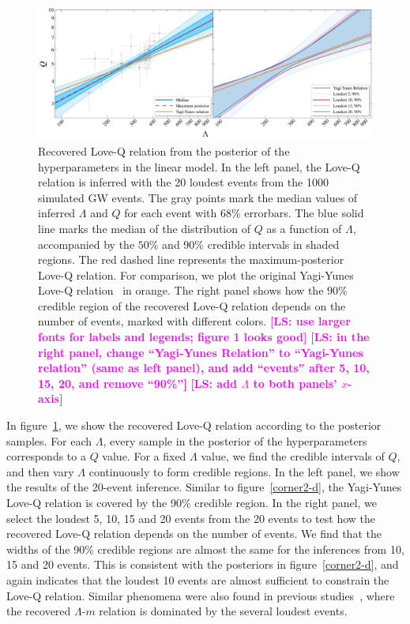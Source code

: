 \documentclass[a4paper,11pt]{article}
\newcommand{\LS}[1]{\textcolor{magenta}{\bf #1}}
\begin{document}
\begin{figure}[t]
\centering
\includegraphics[width=\textwidth]{fig_hierarchical_results_APR4_2d.pdf}
    \caption{Recovered Love-Q relation from the posterior of the hyperparameters
    in the linear model. In the left panel, the Love-Q relation is inferred with
    the 20 loudest events from the 1000 simulated GW events. The gray points
    mark the median values of inferred $\Lambda$ and $Q$ for each event with
    $68\%$ errorbars. The blue solid line marks the median of the distribution
    of $Q$ as a function of $\Lambda$, accompanied by the $50\%$ and $90\%$
    credible intervals in shaded regions.  The red dashed line represents the
    maximum-posterior Love-Q relation. For comparison, we plot the original
    Yagi-Yunes Love-Q relation~\cite{Yagi_2017} in orange. The right panel shows
    how the $90\%$ credible region of the recovered Love-Q relation depends on
    the number of events, marked with different colors. \LS{[LS: use larger
    fonts for labels and legends; figure 1 looks good]} \LS{[LS: in the right
    panel, change ``Yagi-Yunes Relation'' to ``Yagi-Yunes relation'' (same as
    left panel), and add ``events'' after 5, 10, 15, 20, and remove ``90\%'']}
    \LS{[LS: add $\Lambda$ to both panels' $x$-axis]} }    \label{2-d_Love_Q}
\end{figure}

In figure~\ref{2-d_Love_Q}, we show the recovered Love-Q relation according to
the posterior samples. For each $\Lambda$, every sample in the posterior of the 
hyperparameters corresponds to a $Q$ value. For a fixed $\Lambda$ value, we find
the credible intervals of $Q$, and then vary $\Lambda$ continuously to form
credible regions. In the left panel, we show the results of the 20-event
inference. Similar to figure~\ref{corner2-d}, the Yagi-Yunes Love-Q relation is
covered by the 90\% credible region.  In the right panel, we select the loudest
5, 10, 15 and 20 events from the 20 events to test how the recovered Love-Q
relation depends on the number of events. We find that the widths of the 90\%
credible regions are almost the same for the inferences from 10, 15 and 20
events. This is consistent with the posteriors in figure~\ref{corner2-d}, and
again indicates that the loudest 10 events are almost sufficient to constrain
the Love-Q relation. Similar phenomena were also found in previous
studies~\cite{Lackey:2014fwa, Landry:2020vaw, Pang:2020ilf, Finstad:2022oni,
Bandopadhyay:2024zrr, Wang:2024xon}, where the recovered $\Lambda$-$m$ relation
is dominated by the several loudest events.
\end{document}
